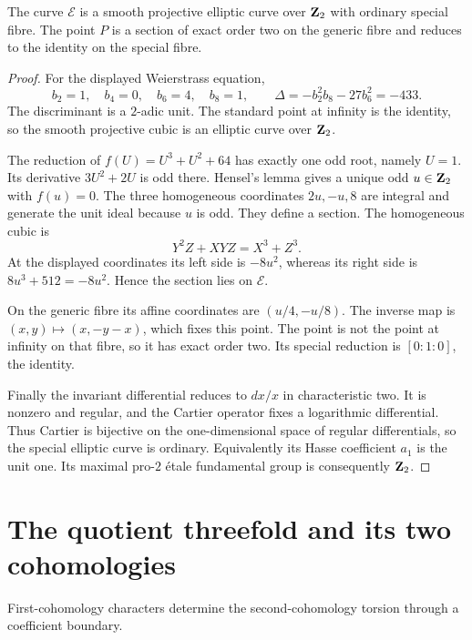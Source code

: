 \documentclass[11pt]{article}
\theoremstyle{definition}\newtheorem{definition}[theorem]{Definition}
\theoremstyle{remark}\newtheorem{remark}[theorem]{Remark}
\begin{document}
\begin{lemma}\label{lem:elliptic}
The curve $\mathcal E$ is a smooth projective elliptic curve over $\mathbf Z_2$ with ordinary special fibre. The point $P$ is a section of exact order two on the generic fibre and reduces to the identity on the special fibre.
\end{lemma}
\begin{proof}
For the displayed Weierstrass equation,
\[
 b_2=1,\quad b_4=0,\quad b_6=4,\quad b_8=1,
 \qquad \Delta=-b_2^2b_8-27b_6^2=-433.
\]
The discriminant is a $2$-adic unit. The standard point at infinity is the identity, so the smooth projective cubic is an elliptic curve over $\mathbf Z_2$.

The reduction of $f(U)=U^3+U^2+64$ has exactly one odd root, namely $U=1$. Its derivative $3U^2+2U$ is odd there. Hensel's lemma gives a unique odd $u\in\mathbf Z_2$ with $f(u)=0$. The three homogeneous coordinates $2u,-u,8$ are integral and generate the unit ideal because $u$ is odd. They define a section. The homogeneous cubic is
\[
 Y^2Z+XYZ=X^3+Z^3.
\]
At the displayed coordinates its left side is $-8u^2$, whereas its right side is $8u^3+512=-8u^2$. Hence the section lies on $\mathcal E$.

On the generic fibre its affine coordinates are $(u/4,-u/8)$. The inverse map is $(x,y)\mapsto(x,-y-x)$, which fixes this point. The point is not the point at infinity on that fibre, so it has exact order two. Its special reduction is $[0:1:0]$, the identity.

Finally the invariant differential reduces to $dx/x$ in characteristic two. It is nonzero and regular, and the Cartier operator fixes a logarithmic differential. Thus Cartier is bijective on the one-dimensional space of regular differentials, so the special elliptic curve is ordinary. Equivalently its Hasse coefficient $a_1$ is the unit one. Its maximal pro-$2$ \'etale fundamental group is consequently $\mathbf Z_2$.
\end{proof}

\section{The quotient threefold and its two cohomologies}

First-cohomology characters determine the second-cohomology torsion through a coefficient boundary.
\end{document}
